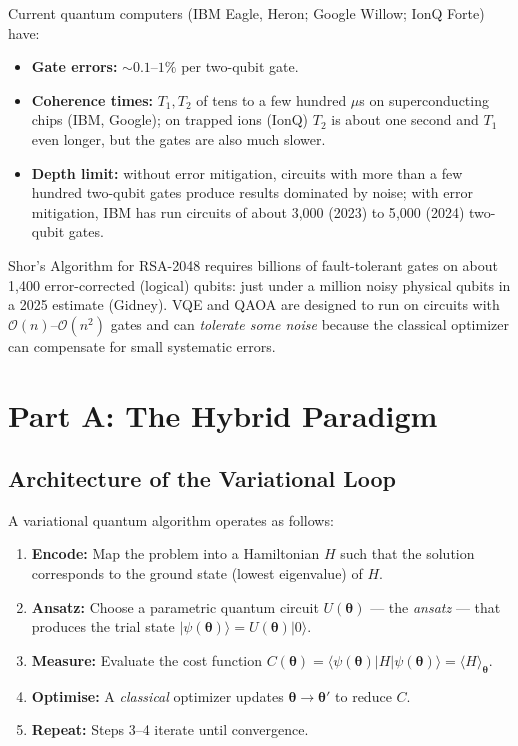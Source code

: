 \documentclass[a4paper,11pt]{article}
\renewcommand{\ket}[1]{|#1\rangle}
\renewcommand{\bra}[1]{\langle#1|}
\newcommand{\expect}[1]{\langle #1 \rangle}
\begin{document}
\begin{warningbox}
Current quantum computers (IBM Eagle, Heron; Google Willow; IonQ Forte)
have:
\begin{itemize}
    \item \textbf{Gate errors:} $\sim\!0.1$--$1\%$ per two-qubit gate.
    \item \textbf{Coherence times:} $T_1, T_2$ of tens to a few hundred $\mu$s on
          superconducting chips (IBM, Google); on trapped ions (IonQ) $T_2$ is about
          one second and $T_1$ even longer, but the gates are also much slower.
    \item \textbf{Depth limit:} without error mitigation, circuits with more than
          a few hundred two-qubit gates produce results dominated by noise; with
          error mitigation, IBM has run circuits of about 3{,}000 (2023) to
          5{,}000 (2024) two-qubit gates.
\end{itemize}
Shor's Algorithm for RSA-2048 requires billions of fault-tolerant gates on
about 1{,}400 error-corrected (logical) qubits: just under a million noisy
physical qubits in a 2025 estimate (Gidney). VQE and QAOA are designed to run on
circuits with $\mathcal{O}(n)$--$\mathcal{O}(n^2)$ gates and can
\emph{tolerate some noise} because the classical optimizer can compensate
for small systematic errors.
\end{warningbox}

\section{Part A: The Hybrid Paradigm}

\subsection{Architecture of the Variational Loop}
\label{sec:var-loop}

A variational quantum algorithm operates as follows:

\begin{enumerate}
    \item \textbf{Encode:} Map the problem into a Hamiltonian $H$ such that the
          solution corresponds to the ground state (lowest eigenvalue) of $H$.
    \item \textbf{Ansatz:} Choose a parametric quantum circuit
          $U(\boldsymbol\theta)$ — the \emph{ansatz} — that produces the trial
          state $\ket{\psi(\boldsymbol\theta)} = U(\boldsymbol\theta)\ket{0}$.
    \item \textbf{Measure:} Evaluate the cost function
          $C(\boldsymbol\theta) = \bra{\psi(\boldsymbol\theta)}H
          \ket{\psi(\boldsymbol\theta)} = \expect{H}_{\boldsymbol\theta}$.
    \item \textbf{Optimise:} A \emph{classical} optimizer updates
          $\boldsymbol\theta \to \boldsymbol\theta'$ to reduce $C$.
    \item \textbf{Repeat:} Steps 3--4 iterate until convergence.
\end{enumerate}
\end{document}
